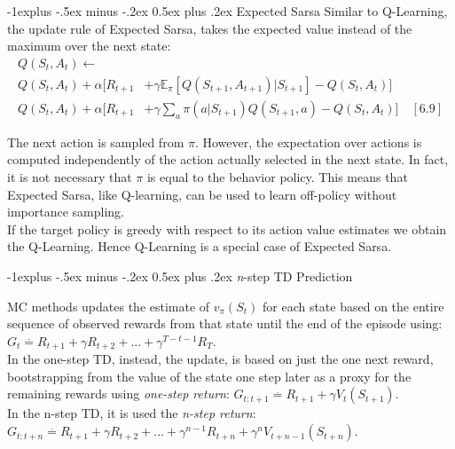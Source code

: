 \documentclass[10pt,landscape]{article}
\makeatletter
\renewcommand{\subsection}{\@startsection{subsection}{2}{0mm}%
                                {-1explus -.5ex minus -.2ex}%
                                {0.5ex plus .2ex}%
                                {\normalfont\normalsize\bfseries}}
\makeatother
\begin{document}
\begin{multicols}{3}
\subsection{Expected Sarsa}
Similar to Q-Learning, the update rule of Expected Sarsa, takes the expected value instead of the maximum over the next state:
\begin{align*}
    Q(S_t, A_t)  \leftarrow & \\
    Q(S_t, A_t) + \alpha [R_{t+1} & + \gamma \mathbb{E}_{\pi} [ Q(S_{t+1}, A_{t+1}) | S_{t+1} ] - Q(S_t, A_t) ] \\
    Q(S_t, A_t) + \alpha [R_{t+1} & + \gamma \sum_a \pi(a| S_{t+1}) Q(S_{t+1}, a) - Q(S_t, A_t)] \quad [6.9]   
\end{align*}

The next action is sampled from $\pi$. However, the expectation over actions is computed independently of the action actually selected in the next state. 
In fact, it is not necessary that $\pi$ is equal to the behavior policy. This means that Expected Sarsa, like Q-learning, can be used to learn off-policy without importance sampling. \\
If the target policy is greedy with respect to its action value estimates we obtain the Q-Learning. Hence Q-Learning is a special case of Expected Sarsa.

\subsection{\emph{n}-step TD Prediction}

MC methods updates the estimate of $v_{\pi}(S_t)$ for each state based on the entire sequence of observed rewards from that state until the end of the episode using: $G_t \stackrel{.}{=} R_{t+1} + \gamma R_{t+2} + ... + \gamma^{T-t-1}R_T$.\\
In the one-step TD, instead, the update, is based on just the one next reward, bootstrapping from the value of the state one step later as a proxy for the remaining rewards using \emph{one-step return}: $G_{t:t+1}\stackrel{.}{=} R_{t+1} + \gamma V_t(S_{t+1})$.\\
In the n-step TD, it is used the \emph{n-step return}: $G_{t:t+n}\stackrel{.}{=} R_{t+1} + \gamma R_{t+2} + ... + \gamma^{n-1} R_{t+n} + \gamma^n V_{t+n-1}(S_{t+n})$.

\end{multicols}

\newpage
\end{document}
